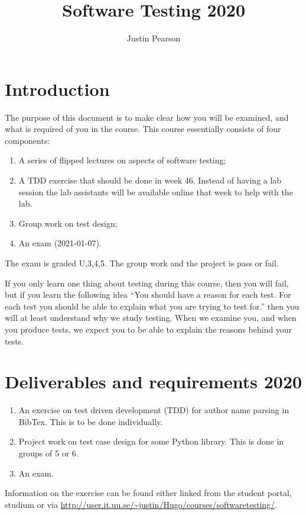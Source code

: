 \documentclass[a4paper]{article}
\title{Software Testing 2020}
\author{Justin Pearson }
\begin{document}
\maketitle
\def\UrlBreaks{\do\/\do-} 

\section{Introduction}
The purpose of this document is to make clear how you will be examined, and
what is required of you in the course.  This course essentially consists of
four components:
\begin{enumerate}
\item A series of flipped lectures on aspects of software testing;

\item A TDD exercise that should be done in week 46. Instead of having a
  lab session the lab assistants will be available online that week to
  help with the lab. 
\item Group work on test design;
\item An exam (2021-01-07).
\end{enumerate}
The exam is graded U,3,4,5. The group work and the project is pass or fail.

If you only learn one thing about testing during this course, then you
will fail, but if you learn the following idea ``You should have a
reason for each test. For each test you should be able to explain what
you are trying to test for.'' then you will at least understand why we
study testing. When we examine you, and when you produce tests, we
expect you to be able to explain the reasons behind your tests.


\section{Deliverables and requirements  2020}



\begin{enumerate}
  \item An exercise on  test driven development (TDD) for  author name
    parsing in BibTex. This is to be done individually.
\item Project work on test case design for some Python library. This
  is done in groups of 5 or 6.
\item An exam.

  \end{enumerate}
  Information on the exercise can be found either linked from the
  student portal,  studium  or  via
  \url{http://user.it.uu.se/~justin/Hugo/courses/softwaretesting/}. 
\end{document}
